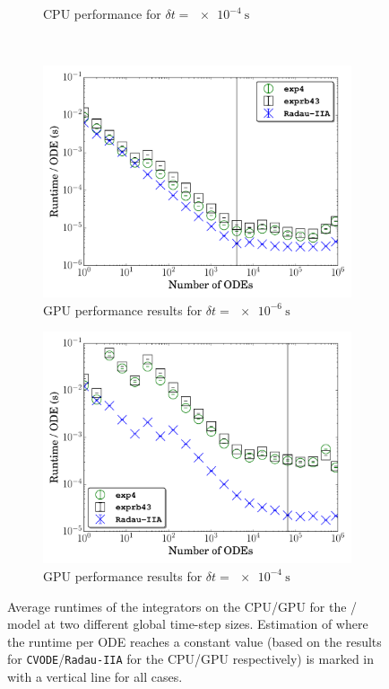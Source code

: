 \documentclass[final,twocolumn]{elsarticle}
\begin{document}
\begin{figure}[htb]
\begin{subfigure}{0.49\textwidth}
      \caption{CPU performance for $\delta t = \SI{e-4}{\second}$}
      \label{F:h2_cpu_perf_large}
  \end{subfigure}\\
  \begin{subfigure}{0.49\textwidth}
      \includegraphics[width=\linewidth]{H2_1e-06_gpu.pdf}
      \caption{GPU performance results for $\delta t = \SI{e-6}{\second}$}
      \label{F:h2_gpu_perf_small}
  \end{subfigure}
  \begin{subfigure}{0.49\textwidth}
      \includegraphics[width=\linewidth]{H2_1e-04_gpu.pdf}
      \caption{GPU performance results for $\delta t = \SI{e-4}{\second}$}
      \label{F:h2_gpu_perf_large}
  \end{subfigure}
  \caption{Average runtimes of the integrators on the CPU\slash GPU for the \slash{} model at two different global time-step sizes.
  Estimation of where the runtime per ODE reaches a constant value (based on the results for \texttt{CVODE}\slash\texttt{Radau-IIA} for the CPU\slash GPU respectively) is marked in with a vertical line for all cases.}
  \label{F:H2_perf}
\end{figure}
\end{document}
